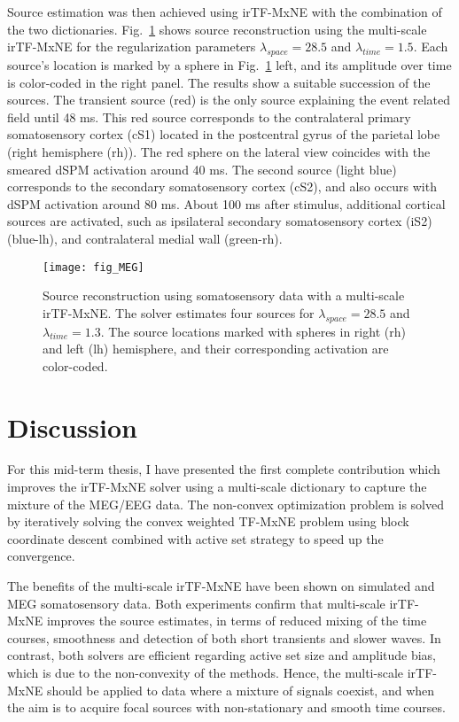 Source estimation was then achieved using irTF-MxNE with the combination of the two dictionaries.
Fig.~\ref{fig:MEG} shows source reconstruction using the multi-scale irTF-MxNE for the regularization parameters $\lambda_{space}=28.5$ and $\lambda_{time}=1.5$. Each source's location is marked by a sphere in Fig.~\ref{fig:MEG} left, and its amplitude over time is color-coded in the right panel. The results show a suitable succession of the sources. The transient source (red) is the only source explaining the event related field until 48 ms. This red source corresponds to the contralateral primary somatosensory cortex (cS1) located in the postcentral gyrus of the parietal lobe (right hemisphere (rh)). The red sphere on the lateral view coincides with the smeared dSPM activation around 40 ms. The second source (light blue) corresponds to the secondary somatosensory cortex (cS2), and also occurs with dSPM activation around 80 ms. About 100 ms after stimulus, additional cortical sources are activated, such as ipsilateral secondary somatosensory cortex (iS2) (blue-lh), and contralateral medial wall (green-rh). 

\begin{figure}
\centering
	\texttt{[image: fig\_MEG]}
    \caption{Source reconstruction using somatosensory data with a multi-scale irTF-MxNE. The solver estimates four sources for $\lambda_{space}=28.5$ and $\lambda_{time}=1.3$. The source locations marked with spheres in right (rh) and left (lh) hemisphere, and their corresponding activation are color-coded.}
	\label{fig:MEG}
\end{figure}

\section{Discussion}
For this mid-term thesis, I have presented the first complete contribution which improves the irTF-MxNE solver using a multi-scale dictionary to capture the mixture of the MEG/EEG data. The non-convex optimization problem is solved by iteratively solving the convex weighted TF-MxNE problem using block coordinate descent combined with active set strategy to speed up the convergence.

The benefits of the multi-scale irTF-MxNE have been shown on simulated and MEG somatosensory data. Both experiments confirm that multi-scale irTF-MxNE improves the source estimates, in terms of reduced mixing of the time courses, smoothness and detection of both short transients and slower waves. In contrast, both solvers are efficient regarding active set size and amplitude bias, which is due to the non-convexity of the methods. Hence, the multi-scale irTF-MxNE should be applied to data where a mixture of signals coexist, and when the aim is to acquire focal sources with non-stationary and smooth time courses.


